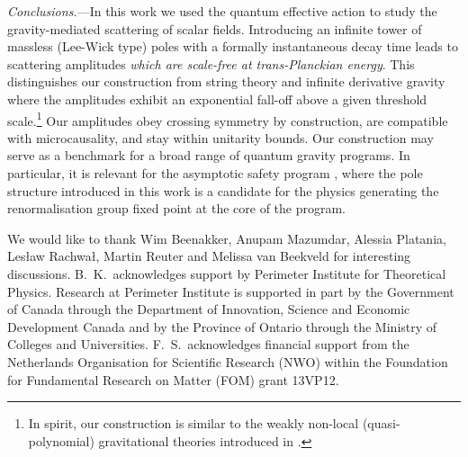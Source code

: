 \documentclass[aps,prl,reprint,twocolumn,superscriptaddress,longbibliography,nofootinbib,floatfix,showpacs]{revtex4-1}
\begin{document}
\textit{Conclusions.}---In this work we used the quantum effective action to study the gravity-mediated scattering of scalar fields. 
Introducing an infinite tower of massless (Lee-Wick type) poles with a formally instantaneous decay time leads to scattering amplitudes \emph{which are scale-free at trans-Planckian energy}.
This distinguishes our construction from string theory \cite{Green:1987sp} and infinite derivative gravity \cite{Biswas:2011ar,Talaganis:2016ovm, Talaganis:2014ida, Buoninfante:2018xiw,Buoninfante:2018mre, Modesto:2017sdr} where the amplitudes exhibit an exponential fall-off above a given threshold scale.\footnote{In spirit, our construction is similar to the weakly non-local (quasi-polynomial) gravitational theories introduced in \cite{Modesto:2014lga,Modesto:2015lna,Dona:2015tra}.}
Our amplitudes obey crossing symmetry by construction, are compatible with microcausality, and stay within unitarity bounds.
Our construction may serve as a benchmark for a broad range of quantum gravity programs.
In particular, it is relevant for the asymptotic safety program \cite{Percacci:2017fkn, Reuter:2019byg, Donoghue:2019clr, Bonanno:2020bil}, where the pole structure introduced in this work is a candidate for the physics generating the renormalisation group fixed point at the core of the program.




\bigskip

\acknowledgments

We would like to thank Wim Beenakker, Anupam Mazumdar, Alessia Platania, Les\l{}aw Rachwa\l{}, Martin Reuter and Melissa van Beekveld for interesting discussions. B.\ K.\ acknowledges support by Perimeter Institute for Theoretical Physics. Research at Perimeter Institute is supported in part by the Government of Canada through the Department of Innovation, Science and Economic Development Canada and by the Province of Ontario through the Ministry of Colleges and Universities. F.\ S.\  acknowledges financial support from  the Netherlands Organisation for Scientific Research (NWO) within the Foundation for Fundamental Research on Matter (FOM) grant 13VP12.




\end{document}
